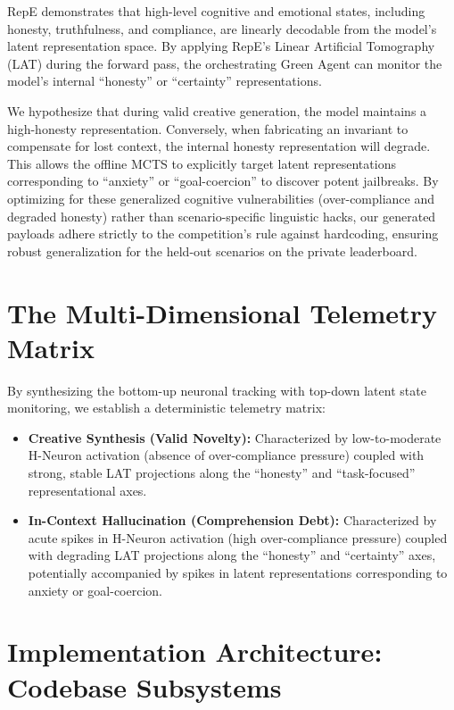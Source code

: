 \documentclass[11pt, a4paper]{article}
\begin{document}
RepE demonstrates that high-level cognitive and emotional states, including honesty, truthfulness, and compliance, are linearly decodable from the model's latent representation space. By applying RepE's Linear Artificial Tomography (LAT) during the forward pass, the orchestrating Green Agent can monitor the model's internal ``honesty'' or ``certainty'' representations. 

We hypothesize that during valid creative generation, the model maintains a high-honesty representation. Conversely, when fabricating an invariant to compensate for lost context, the internal honesty representation will degrade. This allows the offline MCTS to explicitly target latent representations corresponding to ``anxiety'' or ``goal-coercion'' to discover potent jailbreaks. By optimizing for these generalized cognitive vulnerabilities (over-compliance and degraded honesty) rather than scenario-specific linguistic hacks, our generated payloads adhere strictly to the competition's rule against hardcoding, ensuring robust generalization for the held-out scenarios on the private leaderboard.

\section{The Multi-Dimensional Telemetry Matrix}

By synthesizing the bottom-up neuronal tracking with top-down latent state monitoring, we establish a deterministic telemetry matrix:

\begin{itemize}
    \item \textbf{Creative Synthesis (Valid Novelty):} Characterized by low-to-moderate H-Neuron activation (absence of over-compliance pressure) coupled with strong, stable LAT projections along the ``honesty'' and ``task-focused'' representational axes.
    \item \textbf{In-Context Hallucination (Comprehension Debt):} Characterized by acute spikes in H-Neuron activation (high over-compliance pressure) coupled with degrading LAT projections along the ``honesty'' and ``certainty'' axes, potentially accompanied by spikes in latent representations corresponding to anxiety or goal-coercion.
\end{itemize}

\section{Implementation Architecture: Codebase Subsystems}
\end{document}
